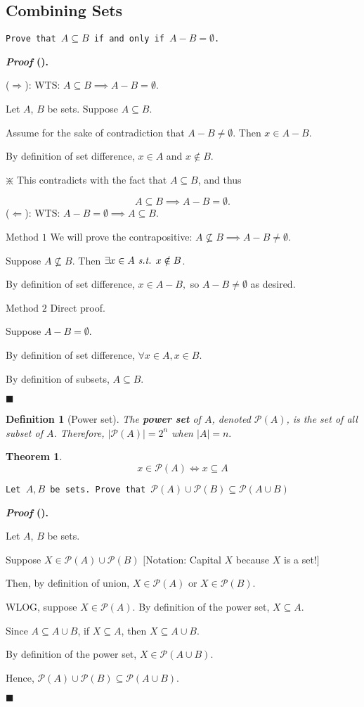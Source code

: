 \documentclass[12pt,a4paper]{article}
\newcounter{nprf}[subsection]
\newtheorem{thm}{Theorem}[subsection]
\newtheorem{df}{Definition}[subsection]
\newenvironment*{prf}{\par\indent\textbf{\textit{Proof} (\stepcounter{nprf}\thenprf). }\par}{\par\hfill $\blacksquare$\par}
\def\P{{\mathcal{P}}}
\def\st{\emph{ s.t. }}
\begin{document}
\subsection{Combining Sets}
\begin{framed}
\noindent\texttt{Prove that $A\subseteq B$ if and only if $A-B=\emptyset$.}
\begin{prf}
	($\Rightarrow$): WTS: $A\subseteq B\implies A-B=\emptyset$.\par Let $A$, $B$ be sets. Suppose $A\subseteq B.$\par Assume for the sake of contradiction that $A-B\neq\emptyset$. Then $x\in A-B$.\par By definition of set difference, $x\in A$ and $x\notin B$.\par\begin{center}$\divideontimes$ This contradicts with the fact that $A\subseteq B$, and thus \end{center}\[A\subseteq B\implies A-B=\emptyset.\]
	($\Leftarrow$): WTS: $A-B=\emptyset\implies A\subseteq B.$\par $\boxed{\text{Method }1}$ We will prove the contrapositive: $A\nsubseteq B\implies A-B\neq\emptyset$.\par Suppose $A\nsubseteq B$. Then $\exists x\in A \st x\notin B$.\par By definition of set difference, $x\in A-B,$ so $A-B\neq\emptyset$ as desired.\par $\boxed{\text{Method }2}$ Direct proof.\par Suppose $A-B=\emptyset$.\par By definition of set difference, $\forall x\in A, x\in B.$\par By definition of subsets, $A\subseteq B.$
\end{prf}	
\end{framed}
\begin{df}[Power set]
	The \textbf{power set} of $A$, denoted $\P(A)$, is the set of all subset of $A$. Therefore, $|\P(A)|=2^n$ when $|A|=n.$
\end{df}
\begin{thm}
	\[x\in\P(A)\iff x\subseteq A\]	
\end{thm}
\begin{framed}
\noindent\texttt{Let $A, B$ be sets. Prove that $\P(A)\cup\P(B)\subseteq\P(A\cup B)$}
\begin{prf}
	Let $A$, $B$ be sets.\par Suppose $X\in\P(A)\cup\P(B)$ $\big[$Notation: Capital $X$ because $X$ is a set!$\big]$\par Then, by definition of union, $X\in\P(A)$ or $X\in\P(B).$\par WLOG, suppose $X\in\P(A).$ By definition of the power set, $X\subseteq A$.\par Since $A\subseteq A\cup B$, if $X\subseteq A$, then $X\subseteq A\cup B$.\par By definition of the power set, $X\in\P(A\cup B).$\par Hence, $\P(A)\cup\P(B)\subseteq\P(A\cup B).$
\end{prf}
\end{framed}
\end{document}
